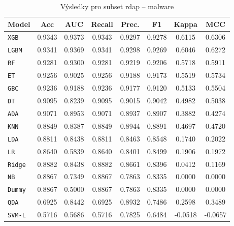 \begin{table}[H]
  \centering
  \small
  \caption{Výsledky pro subset rdap – malware}
  \begin{tabular}{|l|c|c|c|c|c|c|c|}
    \hline
    \textbf{Model} & \textbf{Acc} & \textbf{AUC} & \textbf{Recall} & \textbf{Prec.} & \textbf{F1} & \textbf{Kappa} & \textbf{MCC} \\
    \hline
    \texttt{XGB} & 0.9343 & 0.9373 & 0.9343 & 0.9297 & 0.9278 & 0.6115 & 0.6306 \\
    \texttt{LGBM} & 0.9341 & 0.9369 & 0.9341 & 0.9298 & 0.9269 & 0.6046 & 0.6272 \\
    \texttt{RF} & 0.9281 & 0.9300 & 0.9281 & 0.9219 & 0.9206 & 0.5718 & 0.5911 \\
    \texttt{ET} & 0.9256 & 0.9025 & 0.9256 & 0.9188 & 0.9173 & 0.5519 & 0.5734 \\
    \texttt{GBC} & 0.9236 & 0.9188 & 0.9236 & 0.9177 & 0.9120 & 0.5133 & 0.5504 \\
    \texttt{DT} & 0.9095 & 0.8239 & 0.9095 & 0.9015 & 0.9042 & 0.4982 & 0.5038 \\
    \texttt{ADA} & 0.9071 & 0.8953 & 0.9071 & 0.8937 & 0.8907 & 0.3882 & 0.4274 \\
    \texttt{KNN} & 0.8849 & 0.8387 & 0.8849 & 0.8944 & 0.8891 & 0.4697 & 0.4720 \\
    \texttt{LDA} & 0.8811 & 0.8438 & 0.8811 & 0.8463 & 0.8548 & 0.1740 & 0.2022 \\
    \texttt{LR} & 0.8640 & 0.5839 & 0.8640 & 0.8401 & 0.8499 & 0.1906 & 0.1972 \\
    \texttt{Ridge} & 0.8882 & 0.8438 & 0.8882 & 0.8661 & 0.8396 & 0.0412 & 0.1169 \\
    \texttt{NB} & 0.8867 & 0.7349 & 0.8867 & 0.7863 & 0.8335 & 0.0000 & 0.0000 \\
    \texttt{Dummy} & 0.8867 & 0.5000 & 0.8867 & 0.7863 & 0.8335 & 0.0000 & 0.0000 \\
    \texttt{QDA} & 0.6925 & 0.8442 & 0.6925 & 0.8932 & 0.7486 & 0.2598 & 0.3489 \\
    \texttt{SVM-L} & 0.5716 & 0.5686 & 0.5716 & 0.7825 & 0.6484 & -0.0518 & -0.0657 \\
    \hline
  \end{tabular}
\end{table}
\vspace{0.5cm}

